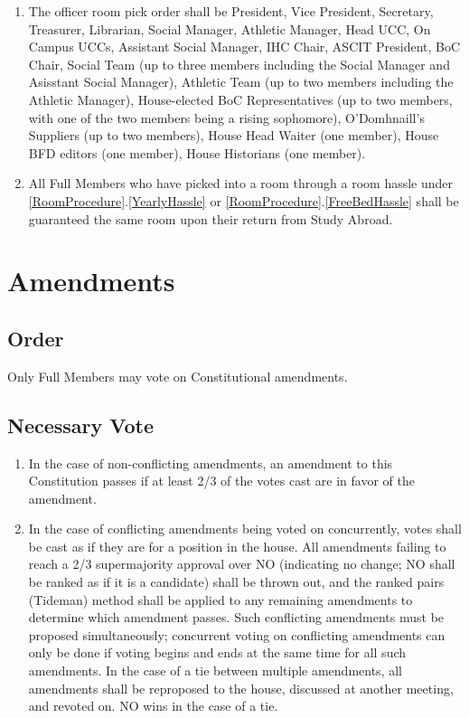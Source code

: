 \documentclass[10pt]{article} %
\begin{document}
\begin{enumerate}
\begin{enumerate}
\end{enumerate}
\item \label{OfficerRoomOrder}The officer room pick order shall be President, Vice President, Secretary, Treasurer, Librarian, Social Manager, Athletic Manager, Head UCC, On Campus UCCs, Assistant Social Manager, IHC Chair, ASCIT President, BoC Chair, Social Team (up to three members including the Social Manager and Asisstant Social Manager), Athletic Team (up to two members including the Athletic Manager), House-elected BoC Representatives (up to two members, with one of the two members being a rising sophomore), O’Domhnaill’s Suppliers (up to two members), House Head Waiter (one member), House BFD editors (one member), House Historians (one member).
\item All Full Members who have picked into a room through a room hassle under \ref{RoomProcedure}.\ref{YearlyHassle} or \ref{RoomProcedure}.\ref{FreeBedHassle} shall be guaranteed the same room upon their return from Study Abroad.
\end{enumerate}
\section{Amendments}
\subsection{Order}
Only Full Members may vote on Constitutional amendments.
\subsection{Necessary Vote}
\begin{enumerate}
\item In the case of non-conflicting amendments, an amendment to this Constitution passes if at least 2/3 of the votes cast are in favor of the amendment.
\item In the case of conflicting amendments being voted on concurrently, votes shall be cast as if they are for a position in the house. All amendments failing to reach a 2/3 supermajority approval over NO (indicating no change; NO shall be ranked as if it is a candidate) shall be thrown out, and the ranked pairs (Tideman) method shall be applied to any remaining amendments to determine which amendment passes. Such conflicting amendments must be proposed simultaneously; concurrent voting on conflicting amendments can only be done if voting begins and ends at the same time for all such amendments. In the case of a tie between multiple amendments, all amendments shall be reproposed to the house, discussed at another meeting, and revoted on. NO wins in the case of a tie.
\end{enumerate}
\end{document}
